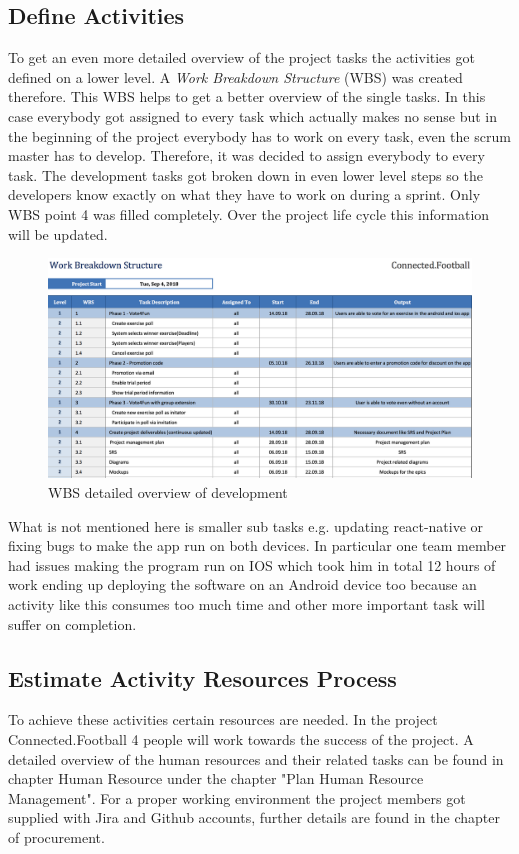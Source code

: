 \subsection{Define Activities}
To get an even more detailed overview of the project tasks the activities got defined on a lower level. A \textit{Work Breakdown Structure} (WBS) was created therefore. This WBS helps to get a better overview of the single tasks. In this case everybody got assigned to every task which actually makes no sense but in the beginning of the project everybody has to work on every task, even the scrum master has to develop. Therefore, it was decided to assign everybody to every task. The development tasks got broken down in even lower level steps so the developers know exactly on what they have to work on during a sprint. Only WBS point 4 was filled completely. Over the project life cycle this information will be updated.
\begin{figure}[H]
  \includegraphics[width=\linewidth]{content/diagram/time/wbs_detailed.png}
  \caption{WBS detailed overview of development}
\end{figure}
What is not mentioned here is smaller sub tasks e.g. updating react-native or fixing bugs to make the app run on both devices. In particular one team member had issues making the program run on IOS which took him in total 12 hours of work ending up deploying the software on an Android device too because an activity like this consumes too much time and other more important task will suffer on completion.

\subsection{Estimate Activity Resources Process}
To achieve these activities certain resources are needed. In the project Connected.Football 4 people will work towards the success of the project. A detailed overview of the human resources and their related tasks can be found in chapter Human Resource under the chapter "Plan Human Resource Management". For a proper working environment the project members got supplied with Jira and Github accounts, further details are found in the chapter of procurement.